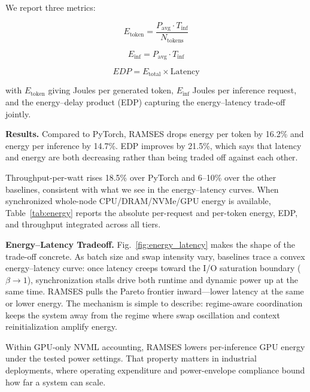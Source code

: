 We report three metrics:

\begin{equation}
E_{\text{token}} = \frac{P_{\text{avg}} \cdot T_{\text{inf}}}{N_{\text{tokens}}}
\end{equation}

\begin{equation}
E_{\text{inf}} = P_{\text{avg}} \cdot T_{\text{inf}}
\end{equation}

\begin{equation}
EDP = E_{\text{total}} \times \text{Latency}
\end{equation}

with $E_{\text{token}}$ giving Joules per generated token,
$E_{\text{inf}}$ Joules per inference request,
and the energy--delay product (EDP) capturing the energy--latency trade-off jointly.

\textbf{Results.}
Compared to PyTorch, RAMSES drops energy per token by 16.2\% and energy per inference by 14.7\%.
EDP improves by 21.5\%, which says that latency and energy are both decreasing rather than being traded off against each other.

Throughput-per-watt rises 18.5\% over PyTorch and 6--10\% over the other baselines, consistent with what we see in the energy--latency curves.
When synchronized whole-node CPU/DRAM/NVMe/GPU energy is available, Table~\ref{tab:energy} reports the absolute per-request and per-token energy, EDP, and throughput integrated across all tiers.



\textbf{Energy--Latency Tradeoff.}
Fig.~\ref{fig:energy_latency} makes the shape of the trade-off concrete. As batch size and swap intensity vary, baselines trace a convex energy--latency curve: once latency creeps toward the I/O saturation boundary ($\beta \to 1$), synchronization stalls drive both runtime and dynamic power up at the same time.
RAMSES pulls the Pareto frontier inward---lower latency at the same or lower energy. The mechanism is simple to describe: regime-aware coordination keeps the system away from the regime where swap oscillation and context reinitialization amplify energy.

Within GPU-only NVML accounting, RAMSES lowers per-inference GPU energy under the tested power settings. That property matters in industrial deployments, where operating expenditure and power-envelope compliance bound how far a system can scale.


